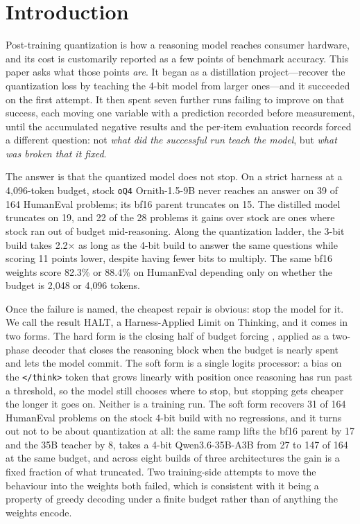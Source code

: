\documentclass[11pt]{article}
\newcommand{\HALT}{\textsc{HALT}}
\newcommand{\Student}{Ornith-1.5-9B}
\newcommand{\oQ}{\texttt{oQ4}}
\begin{document}
\section{Introduction}

Post-training quantization is how a reasoning model reaches consumer hardware,
and its cost is customarily reported as a few points of benchmark accuracy.
This paper asks what those points \emph{are}.  It began as a distillation
project---recover the quantization loss by teaching the 4-bit model from larger
ones---and it succeeded on the first attempt.  It then spent seven further runs
failing to improve on that success, each moving one variable with a prediction
recorded before measurement, until the accumulated negative results and the
per-item evaluation records forced a different question: not \emph{what did
the successful run teach the model}, but \emph{what was broken that it fixed}.

The answer is that the quantized model does not stop.  On a strict harness at a
4{,}096-token budget, stock \oQ{} \Student{} never reaches an answer on 39 of
164 HumanEval problems; its bf16 parent truncates on 15.  The distilled model
truncates on 19, and 22 of the 28 problems it gains over stock are ones where
stock ran out of budget mid-reasoning.  Along the quantization ladder, the
3-bit build takes 2.2$\times$ as long as the 4-bit build to answer the same
questions while scoring 11 points lower, despite having fewer bits to
multiply.  The same bf16 weights score 82.3\% or 88.4\% on HumanEval depending
only on whether the budget is 2{,}048 or 4{,}096 tokens.

Once the failure is named, the cheapest repair is obvious: stop the model for
it.  We call the result \HALT{}, a Harness-Applied Limit on Thinking, and it
comes in two forms.  The hard form is the closing half of budget forcing
\citep{muennighoff2025s1}, applied as a two-phase decoder that closes the
reasoning block when the budget is nearly spent and lets the model commit.  The
soft form is a single logits processor: a bias on the \texttt{</think>} token
that grows linearly with position once reasoning has run past a threshold, so
the model still chooses where to stop, but stopping gets cheaper the longer it
goes on.  Neither is a training run.  The soft form recovers 31 of 164
HumanEval problems on the stock 4-bit build with no regressions, and it turns
out not to be about quantization at all: the same ramp lifts the bf16 parent
by 17 and the 35B teacher by 8, takes a 4-bit Qwen3.6-35B-A3B from 27 to 147 of
164 at the same budget, and across eight builds of three architectures the
gain is a fixed fraction of what truncated.  Two training-side
attempts to move the behaviour into the weights both failed, which is
consistent with it being a property of greedy decoding under a finite budget
rather than of anything the weights encode.
\end{document}
